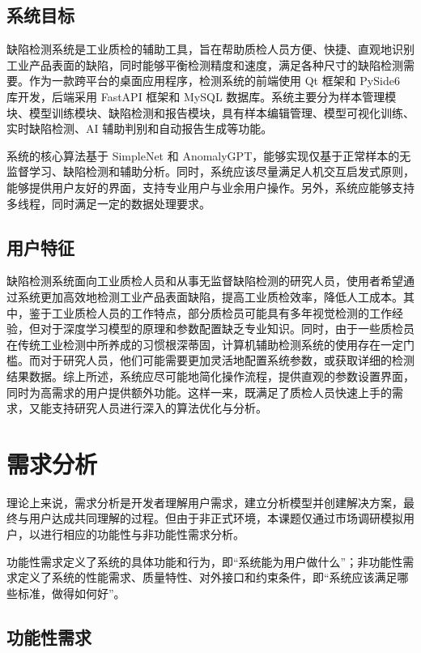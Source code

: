 \documentclass[
  ]{njuthesis}
\begin{document}
\subsection{系统目标}

缺陷检测系统是工业质检的辅助工具，旨在帮助质检人员方便、快捷、直观地识别工业产品表面的缺陷，同时能够平衡检测精度和速度，满足各种尺寸的缺陷检测需要。作为一款跨平台的桌面应用程序，检测系统的前端使用 Qt 框架和 PySide6 库开发，后端采用 FastAPI 框架和 MySQL 数据库。系统主要分为样本管理模块、模型训练模块、缺陷检测和报告模块，具有样本编辑管理、模型可视化训练、实时缺陷检测、AI 辅助判别和自动报告生成等功能。

系统的核心算法基于 SimpleNet 和 AnomalyGPT，能够实现仅基于正常样本的无监督学习、缺陷检测和辅助分析。同时，系统应该尽量满足人机交互启发式原则，能够提供用户友好的界面，支持专业用户与业余用户操作。另外，系统应能够支持多线程，同时满足一定的数据处理要求。

\subsection{用户特征}

缺陷检测系统面向工业质检人员和从事无监督缺陷检测的研究人员，使用者希望通过系统更加高效地检测工业产品表面缺陷，提高工业质检效率，降低人工成本。其中，鉴于工业质检人员的工作特点，部分质检员可能具有多年视觉检测的工作经验，但对于深度学习模型的原理和参数配置缺乏专业知识。同时，由于一些质检员在传统工业检测中所养成的习惯根深蒂固，计算机辅助检测系统的使用存在一定门槛。而对于研究人员，他们可能需要更加灵活地配置系统参数，或获取详细的检测结果数据。综上所述，系统应尽可能地简化操作流程，提供直观的参数设置界面，同时为高需求的用户提供额外功能。这样一来，既满足了质检人员快速上手的需求，又能支持研究人员进行深入的算法优化与分析。

\section{需求分析}

理论上来说，需求分析是开发者理解用户需求，建立分析模型并创建解决方案，最终与用户达成共同理解的过程。但由于非正式环境，本课题仅通过市场调研模拟用户，以进行相应的功能性与非功能性需求分析。

功能性需求定义了系统的具体功能和行为，即“系统能为用户做什么”；非功能性需求定义了系统的性能需求、质量特性、对外接口和约束条件，即“系统应该满足哪些标准，做得如何好”。

\subsection{功能性需求}
\end{document}
